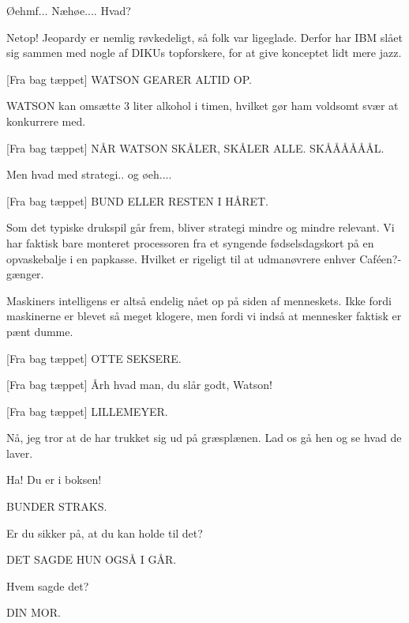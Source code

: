 \documentclass[a4paper,11pt]{article}
\begin{document}
\begin{sketch}
 Øehmf... Næhøe.... Hvad?

 Netop! Jeopardy er nemlig røvkedeligt, så folk var
ligeglade. Derfor har IBM slået sig sammen med nogle af DIKUs
topforskere, for at give konceptet lidt mere jazz.

[Fra bag tæppet] WATSON GEARER ALTID OP.

 WATSON kan omsætte 3 liter alkohol i timen, hvilket gør ham
voldsomt svær at konkurrere med.

[Fra bag tæppet] NÅR WATSON SKÅLER, SKÅLER ALLE. SKÅÅÅÅÅÅL.

 Men hvad med strategi.. og øeh....

[Fra bag tæppet] BUND ELLER RESTEN I HÅRET.

 Som det typiske drukspil går frem, bliver strategi mindre og mindre
relevant. Vi har faktisk bare monteret processoren fra et syngende
fødselsdagskort på en opvaskebalje i en papkasse. Hvilket er rigeligt til at udmanøvrere
enhver Caféen?-gænger.

 Maskiners intelligens er altså endelig nået op på siden af menneskets.
Ikke fordi maskinerne er blevet så meget klogere, men fordi vi indså at
mennesker faktisk er pænt dumme.

[Fra bag tæppet] OTTE SEKSERE.

[Fra bag tæppet] Årh hvad man, du slår godt, Watson!

[Fra bag tæppet] LILLEMEYER.

 Nå, jeg tror at de har trukket sig ud på græsplænen. Lad os gå hen og se
hvad de laver.


 Ha! Du er i boksen!

 BUNDER STRAKS.


 Er du sikker på, at du kan holde til det?

 DET SAGDE HUN OGSÅ I GÅR.

 Hvem sagde det?

 DIN MOR.


\end{sketch}
\end{document}
